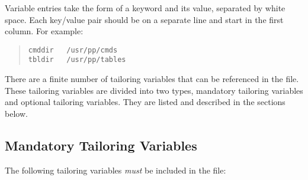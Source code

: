 Variable entries take the form of a keyword and its value, 
separated by white
space. Each key/value pair should be on a separate line and start in
the first column. For example:
\begin{quote}\small\begin{verbatim}
cmddir   /usr/pp/cmds
tbldir   /usr/pp/tables
\end{verbatim}\end{quote}

There are a finite number of tailoring variables that can be
referenced in the  file.  These tailoring variables are
divided into two types, mandatory tailoring variables and optional
tailoring variables.  They are listed and described in the sections
below.

\subsection{Mandatory Tailoring Variables}
The following tailoring variables {\em must} be included in the
 file:

